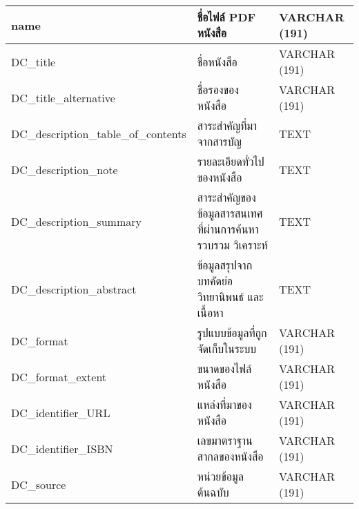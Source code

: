 \begin{longtable}[l]{|l|l|l|}
name                                 & ชื่อไฟล์ PDF หนังสือ                                          & VARCHAR (191)                                                        \\ \hline
DC\_title                            & ชื่อหนังสือ                                                   & VARCHAR (191)                                                        \\ \hline
DC\_title\_alternative               & ชื่อรองของหนังสือ                                             & VARCHAR (191)                                                        \\ \hline
DC\_description\_table\_of\_contents & สาระสำคัญที่มาจากสารบัญ                                      & TEXT                                                                 \\ \hline
DC\_description\_note                & รายละเอียดทั่วไปของหนังสือ                                    & TEXT                                                                 \\ \hline
DC\_description\_summary             & สาระสำคัญของข้อมูลสารสนเทศที่ผ่านการค้นหา   รวบรวม วิเคราะห์ & TEXT                                                                 \\ \hline
DC\_description\_abstract            & ข้อมูลสรุปจากบทคัดย่อ   วิทยานิพนธ์ และเนื้อหา               & TEXT                                                                 \\ \hline
DC\_format                           & รูปแบบข้อมูลที่ถูกจัดเก็บในระบบ                              & VARCHAR (191)                                                        \\ \hline
DC\_format\_extent                   & ขนาดของไฟล์หนังสือ                                            & VARCHAR (191)                                                        \\ \hline
DC\_identifier\_URL                  & แหล่งที่มาของหนังสือ                                          & VARCHAR   (191)                                                      \\ \hline
DC\_identifier\_ISBN                 & เลขมาตราฐานสากลของหนังสือ                                     & VARCHAR   (191)                                                      \\ \hline
DC\_source                           & หน่วยข้อมูลต้นฉบับ                                           & VARCHAR   (191)                                                      \\ \hline

\end{longtable}
